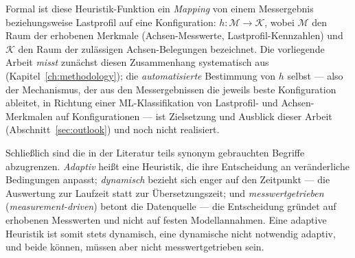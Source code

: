 Formal ist diese Heuristik-Funktion ein \emph{Mapping} von einem Messergebnis beziehungsweise
Lastprofil auf eine Konfiguration: $h: \mathcal{M} \rightarrow \mathcal{K}$, wobei $\mathcal{M}$ den
Raum der erhobenen Merkmale (Achsen-Messwerte, Lastprofil-Kennzahlen) und $\mathcal{K}$ den Raum der
zulässigen Achsen-Belegungen bezeichnet. Die vorliegende Arbeit \emph{misst} zunächst diesen
Zusammenhang systematisch aus (Kapitel~\ref{ch:methodology}); die \emph{automatisierte} Bestimmung
von $h$ selbst --- also der Mechanismus, der aus den Messergebnissen die jeweils beste Konfiguration
ableitet, in Richtung einer ML-Klassifikation von Lastprofil- und Achsen-Merkmalen auf
Konfigurationen --- ist Zielsetzung und Ausblick dieser Arbeit (Abschnitt~\ref{sec:outlook}) und
noch nicht realisiert.

Schließlich sind die in der Literatur teils synonym gebrauchten Begriffe abzugrenzen\@. \emph{Adaptiv}
heißt eine Heuristik, die ihre Entscheidung an veränderliche Bedingungen anpasst; \emph{dynamisch}
bezieht sich enger auf den Zeitpunkt --- die Auswertung zur Laufzeit statt zur Übersetzungszeit; und
\emph{messwertgetrieben} (\emph{measurement-driven}) betont die Datenquelle --- die Entscheidung
gründet auf erhobenen Messwerten und nicht auf festen Modellannahmen. Eine adaptive Heuristik ist
somit stets dynamisch, eine dynamische nicht notwendig adaptiv, und beide können, müssen aber nicht
messwertgetrieben sein.

